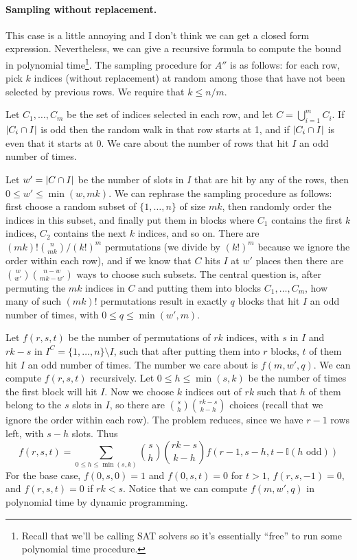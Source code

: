 \documentclass[11pt]{article}
\begin{document}
\paragraph{Sampling without replacement.}
This case is a little annoying and I don't think we can get a closed form
expression.
Nevertheless, we can give a recursive formula to compute the bound in polynomial
time\footnote{Recall that we'll be calling SAT solvers so it's essentially
  ``free'' to run some polynomial time procedure.}.
The sampling procedure for $A''$ is as follows: for each row, pick $k$ indices
(without replacement) at random among those that have not been selected by
previous rows.
We require that $k \leq n / m$.

Let $C_1, \dots, C_m$ be the set of indices selected in each row, and let $C =
\bigcup_{i=1}^m C_i$.
If $\left\lvert C_i \cap I\right\rvert$ is odd then the random walk in that row starts at 1, and if
$\left\lvert C_i \cap I\right\rvert$ is even that it starts at 0.
We care about the number of rows that hit $I$ an odd number of times.

Let $w' = \left\lvert C \cap I\right\rvert$ be the number of slots in $I$ that are hit by any of the
rows, then $0 \leq w' \leq \min(w, mk)$.
We can rephrase the sampling procedure as follows: first choose a random subset
of $\{ 1, \dots, n \}$ of size $mk$, then randomly order the indices in this
subset, and finally put them in blocks where $C_1$ contains the first $k$
indices, $C_2$ contains the next $k$ indices, and so on.
There are $(mk)! 
\binom{n}{mk} / (k!)^m$ permutations (we divide by $(k!)^m$ because we ignore
the order within each row), and if we know that $C$ hits $I$ at $w'$ places then
there are $\binom{w}{w'} \binom{n - w}{mk - w'}$ ways to choose such subsets.
The central question is, after permuting the $mk$ indices in $C$ and putting
them into blocks $C_1, \dots, C_m$, how many of such $(mk)!$ permutations result
in exactly $q$ blocks that hit $I$ an odd number of times, with $0 \leq q \leq
\min(w', m)$.

Let $f(r, s, t)$ be the number of permutations of $rk$ indices, with $s$ in $I$
and $rk - s$ in $I^C = \{ 1, \dots, n \} \setminus I$, such that after putting them into
$r$ blocks, $t$ of them hit $I$ an odd number of times.
The number we care about is $f(m, w', q)$.
We can compute $f(r, s, t)$ recursively.
Let $0 \leq h \leq \min(s, k)$ be the number of times the first block will hit $I$.
Now we choose $k$ indices out of $rk$ such that $h$ of them belong to the $s$
slots in $I$, so there are $\binom{s}{h} \binom{rk - s}{k - h}$ choices (recall
that we ignore the order within each row).
The problem reduces, since we have $r - 1$ rows left, with $s - h$ slots.
Thus
\begin{equation*}
  f(r, s, t) = \sum_{0 \leq h \leq \min(s, k)} \binom{s}{h}
  \binom{rk-s}{k - h} f(r-1, s-h,
  t-\mathbb{I}(h \text{ odd})) 
\end{equation*}
For the base case, $f(0, s, 0) = 1$ and $f(0, s, t) = 0$ for $t > 1$, $f(r, s,
-1) = 0$, and $f(r, s, t) = 0$ if $rk < s$.
Notice that we can compute $f(m, w', q)$ in polynomial time by dynamic
programming.
\end{document}
